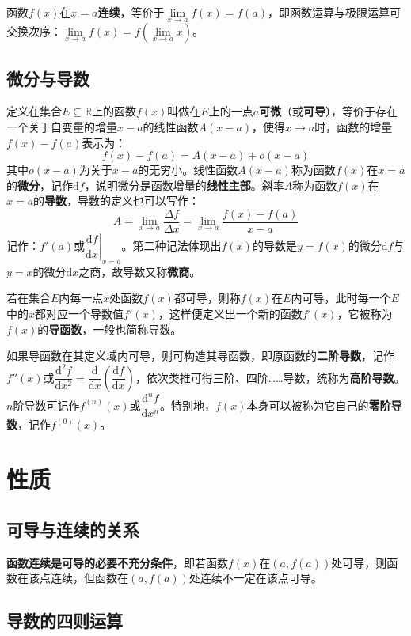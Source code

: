 \documentclass[fontset=none,openany,a4paper]{ctexbook}
\begin{document}
函数$f(x)$在$x=a$\textbf{连续}，等价于$\lim\limits_{x\to a}f(x)=f(a)$，即函数运算与极限运算可交换次序：$\lim\limits_{x\to a}f(x)=f\left(\lim\limits_{x\to a}x\right)$。

\subsection{微分与导数}

定义在集合$E\subseteq\mathbb{R}$上的函数$f(x)$叫做在$E$上的一点$a$\textbf{可微}（或\textbf{可导}），等价于存在一个关于自变量的增量$x-a$的线性函数$A(x-a)$，使得$x\to a$时，函数的增量$f(x)-f(a)$表示为：
\[
f(x) - f(a) = A(x-a) + o(x-a)
\]
其中$o(x-a)$为关于$x-a$的无穷小。线性函数$A(x-a)$称为函数$f(x)$在$x=a$的\textbf{微分}，记作$\mathrm{d}f$，说明微分是函数增量的\textbf{线性主部}。斜率$A$称为函数$f(x)$在$x=a$的\textbf{导数}，导数的定义也可以写作：
\[
A = \lim_{x\to a}\frac{\Delta f}{\Delta x} = \lim_{x\to a}\frac{f(x)-f(a)}{x-a}
\]
记作：$f'(a)$或$\left.\dfrac{\mathrm{d}f}{\mathrm{d}x}\right|_{x=a}$。第二种记法体现出$f(x)$的导数是$y=f(x)$的微分$\mathrm{d}f$与$y=x$的微分$\mathrm{d}x$之商，故导数又称\textbf{微商}。

若在集合$E$内每一点$x$处函数$f(x)$都可导，则称$f(x)$在$E$内可导，此时每一个$E$中的$x$都对应一个导数值$f'(x)$，这样便定义出一个新的函数$f'(x)$，它被称为$f(x)$的\textbf{导函数}，一般也简称导数。

如果导函数在其定义域内可导，则可构造其导函数，即原函数的\textbf{二阶导数}，记作$f''(x)$或$\dfrac{\mathrm{d}^2f}{\mathrm{d}x^2}=\dfrac{\mathrm{d}}{\mathrm{d}x}\left(\dfrac{\mathrm{d}f}{\mathrm{d}x}\right)$，依次类推可得三阶、四阶……导数，统称为\textbf{高阶导数}。$n$阶导数可记作$f^{(n)}(x)$或$\dfrac{\mathrm{d}^n f}{\mathrm{d}x^n}$。特别地，$f(x)$本身可以被称为它自己的\textbf{零阶导数}，记作$f^{(0)}(x)$。

\section{性质}

\subsection{可导与连续的关系}

\textbf{函数连续是可导的必要不充分条件}，即若函数$f(x)$在$(a,f(a))$处可导，则函数在该点连续，但函数在$(a,f(a))$处连续不一定在该点可导。

\subsection{导数的四则运算}
\end{document}
